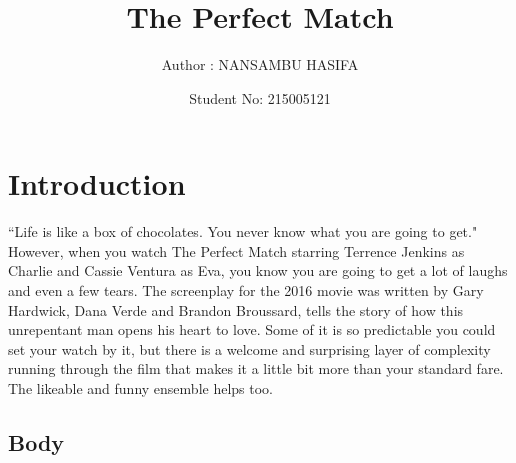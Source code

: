 \documentclass{article}
\begin{document}
		\title{The Perfect Match}
		\author{Author : NANSAMBU HASIFA }
		\date{Student No: 215005121}
		\maketitle
	
\tableofcontents



\section{Introduction}
     “Life is like a box of chocolates. You never know what you are going to get." However, when you watch The Perfect Match starring Terrence Jenkins as Charlie and Cassie Ventura as Eva, you know you are going to get a lot of laughs and even a few tears. The screenplay for the 2016 movie was written by Gary Hardwick, Dana Verde and Brandon Broussard, tells the story of how this unrepentant man opens his heart to love. Some of it is so predictable you could set your watch by it, but there is a welcome and surprising layer of complexity running through the film that makes it a little bit more than your standard fare. The likeable and funny ensemble helps too.

\subsection{Body}
    
\end{document}
